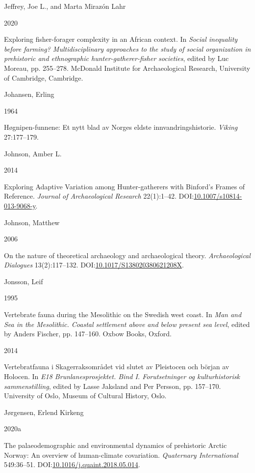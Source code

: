 \documentclass[
  12pt,
  a4paper,
  oneside]{book}
\newlength{\cslhangindent}
\newlength{\csllabelwidth}
\newlength{\cslentryspacingunit} %
\newenvironment{CSLReferences}[2] %
 {%
  \setlength{\parindent}{0pt}
  \ifodd #1
  \let\oldpar\par
  \def\par{\hangindent=\cslhangindent\oldpar}
  \fi
  \setlength{\parskip}{#2\cslentryspacingunit}
 }%
 {}
\newcommand{\CSLBlock}[1]{#1\hfill\break}
\newcommand{\CSLLeftMargin}[1]{\parbox[t]{\csllabelwidth}{#1}}
\newcommand{\CSLRightInline}[1]{\parbox[t]{\linewidth - \csllabelwidth}{#1}\break}
\begin{document}
\begin{CSLReferences}{0}{0}
\leavevmode{}%
\CSLBlock{Jeffrey, Joe L., and Marta Mirazón Lahr}
\CSLLeftMargin{ 2020}
\CSLRightInline{{Exploring fisher-forager complexity in an African context}. In \emph{{Social inequality before farming? Multidisciplinary approaches to the study of social organization in prehistoric and ethnographic hunter-gatherer-fisher societies}}, edited by Luc Moreau, pp. 255--278. McDonald Institute for Archaeological Research, University of Cambridge, Cambridge.}

\leavevmode{}%
\CSLBlock{Johansen, Erling}
\CSLLeftMargin{ 1964}
\CSLRightInline{{Høgnipen-funnene: Et nytt blad av Norges eldste innvandringshistorie}. \emph{Viking} 27:177--179.}

\leavevmode{}%
\CSLBlock{Johnson, Amber L.}
\CSLLeftMargin{ 2014}
\CSLRightInline{{Exploring Adaptive Variation among Hunter-gatherers with Binford's Frames of Reference}. \emph{Journal of Archaeological Research} 22(1):1--42. DOI:\href{https://doi.org/10.1007/s10814-013-9068-y}{10.1007/s10814-013-9068-y}.}

\leavevmode{}%
\CSLBlock{Johnson, Matthew}
\CSLLeftMargin{ 2006}
\CSLRightInline{{On the nature of theoretical archaeology and archaeological theory}. \emph{Archaeological Dialogues} 13(2):117--132. DOI:\href{https://doi.org/10.1017/S138020380621208X}{10.1017/S138020380621208X}.}

\leavevmode{}%
\CSLBlock{Jonsson, Leif}
\CSLLeftMargin{ 1995}
\CSLRightInline{{Vertebrate fauna during the Mesolithic on the Swedish west coast}. In \emph{{Man and Sea in the Mesolithic. Coastal settlement above and below present sea level}}, edited by Anders Fischer, pp. 147--160. Oxbow Books, Oxford.}

\leavevmode{}%
\CSLLeftMargin{ 2014 }
\CSLRightInline{{Vertebratfauna i Skagerraksområdet vid slutet av Pleistocen och början av Holocen}. In \emph{{E18 Brunlanesprosjektet. Bind I. Forutsetninger og kulturhistorisk sammenstilling}}, edited by Lasse Jaksland and Per Persson, pp. 157--170. University of Oslo, Museum of Cultural History, Oslo.}

\leavevmode{}%
\CSLBlock{Jørgensen, Erlend Kirkeng}
\CSLLeftMargin{ 2020a}
\CSLRightInline{{The palaeodemographic and environmental dynamics of prehistoric Arctic Norway: An overview of human-climate covariation}. \emph{Quaternary International} 549:36--51. DOI:\href{https://doi.org/10.1016/j.quaint.2018.05.014}{10.1016/j.quaint.2018.05.014}.}


\end{CSLReferences}
\end{document}
